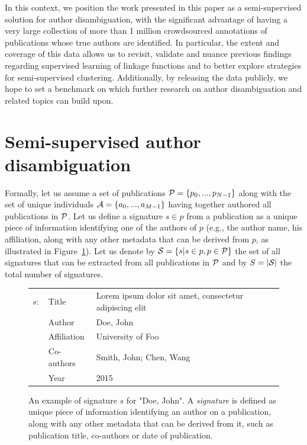\documentclass{article}
\begin{document}
In this context, we position the work presented in this paper as a
semi-supervised  solution for author disambiguation, with the significant
advantage of having a very large collection of more than 1 million crowdsourced annotations
of publications whose true authors are identified. In particular, the extent and coverage
of this data allows us to revisit, validate and nuance previous findings regarding
supervised learning of linkage functions and to better explore strategies
for semi-supervised clustering. Additionally, by releasing the data publicly,
we hope to set a benchmark on which further research on author disambiguation
and related topics can  build upon.




\section{Semi-supervised author disambiguation}
\label{methods}

Formally, let us assume a set of publications ${\cal P} = \{ p_0, ...,
p_{N-1}\}$ along with the set of unique individuals ${\cal A} = \{ a_0, ...,
a_{M-1}\}$ having together authored all publications in ${\cal P}$.  Let us
define a signature $s \in p$ from a publication as a unique piece of
information identifying one of the authors of $p$ (e.g., the author name, his
affiliation, along with any other metadata that can be derived from $p$, as illustrated in Figure~\ref{fig:signature}). Let us
denote by ${\cal S} = \{ s | s \in p, p \in {\cal P} \}$ the set of all
signatures that can be extracted from all publications in ${\cal P}$ and
by $S=|{\cal S}|$ the total number of signatures.

\begin{figure}
\begin{tabular}{ l l l }
  $s:$ & Title & Lorem ipsum dolor sit amet, consectetur adipiscing elit \\
  & Author & Doe, John \\
  & Affiliation & University of Foo \\
  & Co-authors & Smith, John; Chen, Wang\\
  & Year & 2015\\
\end{tabular}

\caption{An example of signature $s$ for "Doe, John". A \textit{signature} is
defined as unique piece of information identifying an author on a publication,
along with any other metadata that can be derived from it, such as publication
title, co-authors or date of publication.}
\label{fig:signature}
\end{figure}
\end{document}
